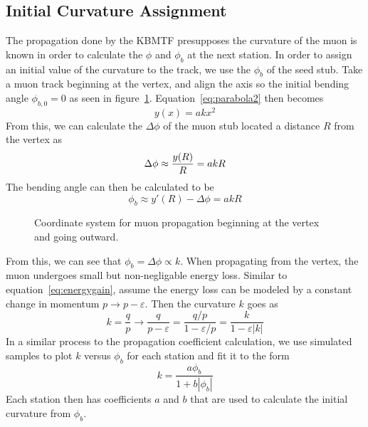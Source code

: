 \subsection{Initial Curvature Assignment} \label{sec:kmtf_initk}
The propagation done by the KBMTF presupposes the curvature of the muon is known in order to calculate the $\phi$ and $\phi_b$ at the next station. In order to assign an initial value of the curvature to the track, we use the $\phi_b$ of the seed stub. Take a muon track beginning at the vertex, and align the axis so the initial bending angle $\phi_{b,0}=0$ as seen in figure~\ref{fig:mu_prop_vertex}. Equation~\ref{eq:parabola2} then becomes
\begin{equation}
	y(x)=akx^2
\end{equation}
From this, we can calculate the $\Delta\phi$ of the muon stub located a distance $R$ from the vertex as
\begin{equation}
	\Delta\phi\approx\frac{y(R)}{R}=akR\\
\end{equation}
The bending angle can then be calculated to be
\begin{equation}
	\label{eq:initPhiB}
	\phi_b\approx y'(R)-\Delta\phi=akR
\end{equation}

\begin{figure}[htb!]
	\centering
	
	\caption[Coordinate system for muon propagation beginning at the vertex and going outward.]{Coordinate system for muon propagation beginning at the vertex and going outward.}
	\label{fig:mu_prop_vertex}
\end{figure}
From this, we can see that $\phi_b=\Delta\phi\propto k$. When propagating from the vertex, the muon undergoes small but non-negligable energy loss. Similar to equation~\ref{eq:energygain}, assume the energy loss can be modeled by a constant change in momentum $p\to p-\varepsilon$. Then the curvature $k$ goes as
\begin{equation}
	\label{eq:energyloss}
	k=\frac{q}{p}\to\frac{q}{p-\varepsilon}=\frac{q/p}{1-\varepsilon/p}=\frac{k}{1-\varepsilon |k|}
\end{equation}
In a similar process to the propagation coefficient calculation, we use simulated samples to plot $k$ versus $\phi_b$ for each station and fit it to the form
\begin{equation}
	k=\frac{a\phi_b}{1+b|\phi_b|}
\end{equation}
Each station then has coefficients $a$ and $b$ that are used to calculate the initial curvature from $\phi_b$.

